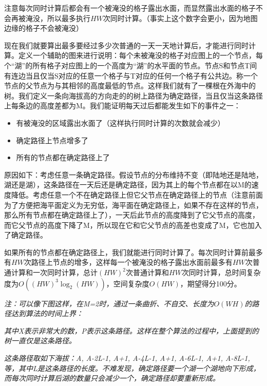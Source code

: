 \documentclass[UTF8]{ctexart}
\begin{document}
		注意每次同时计算后都会有一个被淹没的格子露出水面，而显然露出水面的格子不会再被淹没，所以最多执行$HW$次同时计算。（事实上这个数字会更小，因为地图边缘的格子不会被淹没）
		
		现在我们就要算出最多要经过多少次普通的一天一天地计算后，才能进行同时计算。定义一个辅助的图来进行说明：每个未被淹没的格子对应图上的一个节点，每个“湖”的所有格子对应图上的一个高度为“湖”的水平面的节点。节点S和节点T间有连边当且仅当S对应的任意一个格子与T对应的任何一个格子有公共边。称一个节点的父节点为与其相邻的高度最低的节点。这样我们就有了一棵根在外海中的树。我们定义一条向海拔高的方向走的的树上路径为确定路径，当且仅当这条路径上每条边的高度差都为M。我们能证明每天过后都能发生如下的事件之一：
		
		\begin{itemize}[leftmargin=15mm]
			\item 有被淹没的区域露出水面了（这样执行同时计算的次数就会减少）
			\item 确定路径上节点增多了
			\item 所有的节点都在确定路径上了
		\end{itemize}
		
		原因如下：考虑任意一条确定路径。假设节点的分布维持不变（即陆地还是陆地，湖还是湖），这条路径在一天后还是确定路径，因为其上的每个节点都在以M的速度降低。考虑任意一个不在确定路径上但它父节点在确定路径上的节点（注意前面为了方便把海平面定义为无穷低，海平面在确定路径上，如果不存在这样的节点，那么所有节点都在确定路径上了），一天后此节点的高度降到了它父节点的高度，而它父节点的高度下降了M，所以现在它和它父节点的高差也变成了M，它也加入了确定路径。
		
		如果所有的节点都在确定路径上，我们就能进行同时计算了。每次同时计算前最多有$HW$次路径上节点的增多，这样每一个被淹没的格子露出水面前最多有$HW$次普通计算和一次同时计算，总计$(HW)^2$次普通计算和$HW$次同时计算，总时间复杂度为$O((HW)^3 \log_2(HW))$，空间复杂度$O(HW)$，期望得分100分。
		
		\emph{
			注：可以像下图这样，在M=2时，通过一条曲折、不自交、长度为$O(WH)$的路径达到算法的时间上界：
		}
		
		\begin{center}\end{center}
		
		\emph{
			其中X表示非常大的数，P表示这条路径。这样在整个算法的过程中，上面提到的树一直仅是这条路径。
		}
		
		\emph{
			这条路径取如下海拔：A, A-2L-1, A+1, A-4L-1, A+1, A-6L-1, A+1, A-8L-1, 等，其中L是这条路径的长度。不难发现，确定路径要一个湖一个湖地向下形成，而每次同时计算后湖的数量只会减少一个，确定路径却要重新形成。
		}
		
\end{document}
